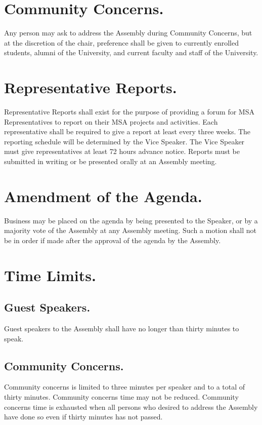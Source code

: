 \documentclass{rules}
\begin{document}
\section{Community Concerns.}
Any person may ask to address the Assembly during Community Concerns, but at the discretion of the chair, preference shall be given to currently enrolled students, alumni of the University, and current faculty and staff of the University.

\section{Representative Reports.}
Representative Reports shall exist for the purpose of providing a forum for MSA Representatives to report on their MSA projects and activities.  Each representative shall be required to give a report at least every three weeks.  The reporting schedule will be determined by the Vice Speaker.  The Vice Speaker must give representatives at least 72 hours advance notice.  Reports must be submitted in writing or be presented orally at an Assembly meeting. 

\section{Amendment of the Agenda.}
Business may be placed on the agenda by being presented to the Speaker, or by a majority vote of the Assembly at any Assembly meeting.  Such a motion shall not be in order if made after the approval of the agenda by the Assembly.

\section{Time Limits.}
\subsection{Guest Speakers.}
Guest speakers to the Assembly shall have no longer than thirty minutes to speak.
\subsection{Community Concerns.}
Community concerns is limited to three minutes per speaker and to a total of thirty minutes. Community concerns time may not be reduced.  Community concerns time is exhausted when all persons who desired to address the Assembly have done so even if thirty minutes has not passed.
\end{document}

